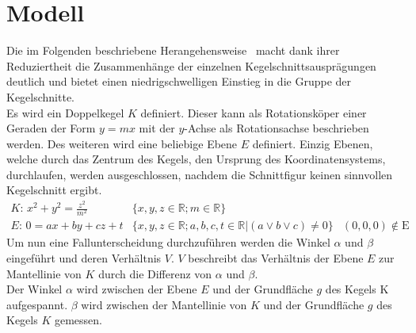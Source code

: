 \setcounter{section}{0}
\section{Modell}
Die im Folgenden beschriebene Herangehensweise~\cite[S.83f]{Jennings:1994} macht dank ihrer Reduziertheit die Zusammenhänge der einzelnen Kegelschnittsausprägungen deutlich und bietet einen niedrigschwelligen Einstieg in die Gruppe der Kegelschnitte.\\
Es wird ein Doppelkegel $K$ definiert\cite[S.793]{Bronstein:1996}. Dieser kann als Rotationsköper einer Geraden der Form $y=mx$ mit der $y$-Achse als Rotationsachse beschrieben werden. Des weiteren wird eine beliebige Ebene $E$ definiert. Einzig Ebenen, welche durch das Zentrum des Kegels, den Ursprung des Koordinatensystems, durchlaufen, werden ausgeschlossen, nachdem die Schnittfigur keinen sinnvollen Kegelschnitt ergibt.
\begin{displaymath}
	\begin{array}{lrl}
		\text{$K$: }x^2+y^2=\frac{z^2}{m^2} & \{x,y,z\in \mathbb{R};m\in \mathbb{R}\}\\
		\text{$E$: }0=ax+by+cz+t & \{x,y,z\in \mathbb{R}; a,b,c,t\in \mathbb{R}|(a \lor b \lor c) \neq 0\} & (0,0,0) \notin \text{E}
	\end{array}
\end{displaymath}
Um nun eine Fallunterscheidung durchzuführen werden die Winkel \(\alpha\) und \(\beta\) eingeführt und deren Verhältnis $V$. $V$ beschreibt das Verhältnis der Ebene $E$ zur Mantellinie von $K$ durch die Differenz von \(\alpha\) und \(\beta\).\\
Der Winkel \(\alpha\) wird zwischen der Ebene $E$ und der Grundfläche $g$ des Kegels K aufgespannt. \(\beta\) wird zwischen der Mantellinie von $K$ und der Grundfläche $g$ des Kegels $K$ gemessen.\\

